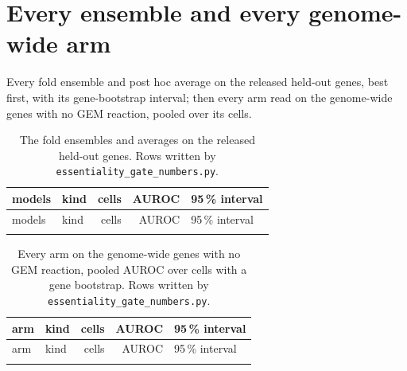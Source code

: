 
\clearpage
\section{Every ensemble and every genome-wide arm}
\label{sec:performance}

Every fold ensemble and post hoc average on the \gnHeldOut{} released held-out genes,
best first, with its gene-bootstrap interval; then every arm read on the \ggenomeN{}
genome-wide genes with no GEM reaction, pooled over its cells.

{\scriptsize
\setlength{\tabcolsep}{3pt}
\begin{longtable}{@{}>{\raggedright\arraybackslash}p{104mm}>{\raggedright\arraybackslash}p{20mm}rrl@{}}
  \caption[]{The \gnCombinations{} fold ensembles and averages on the released held-out
  genes. Rows written by \texttt{essentiality\_gate\_numbers.py}.}
  \label{tab:families}\\
  \toprule
  models & kind & cells & AUROC & 95\,\% interval \\
  \midrule
  \endfirsthead
  \toprule
  models & kind & cells & AUROC & 95\,\% interval \\
  \midrule
  \endhead
  \bottomrule
  \endlastfoot
  
\end{longtable}}

{\scriptsize
\setlength{\tabcolsep}{3pt}
\begin{longtable}{@{}>{\raggedright\arraybackslash}p{104mm}>{\raggedright\arraybackslash}p{20mm}rrl@{}}
  \caption[]{Every arm on the genome-wide genes with no GEM reaction, pooled AUROC over
  cells with a gene bootstrap. Rows written by \texttt{essentiality\_gate\_numbers.py}.}
  \label{tab:genome}\\
  \toprule
  arm & kind & cells & AUROC & 95\,\% interval \\
  \midrule
  \endfirsthead
  \toprule
  arm & kind & cells & AUROC & 95\,\% interval \\
  \midrule
  \endhead
  \bottomrule
  \endlastfoot
  
\end{longtable}}
